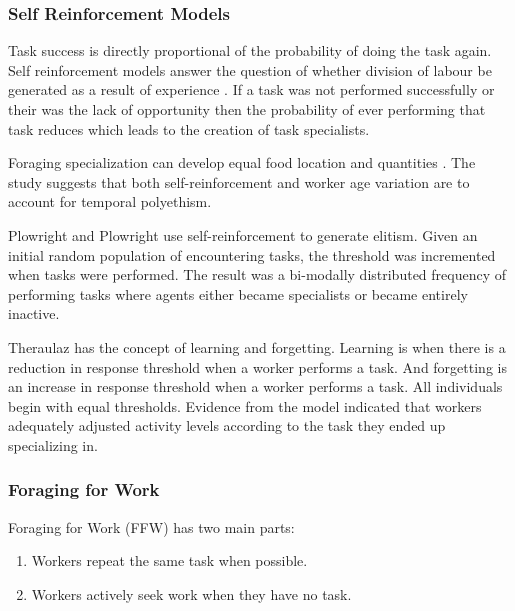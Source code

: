 \subsubsection{Self Reinforcement Models}
Task success is directly proportional of the probability of doing the task again. Self reinforcement models answer the question of whether division of labour be generated as a result of experience \cite{lerman2005review}. If a task was not performed successfully or their was the lack of opportunity then the probability of ever performing that task reduces which leads to the creation of task specialists. 

Foraging specialization can develop equal food location and quantities \cite{deneubourg1987self}.
The study suggests that both self-reinforcement and worker age variation are to account for temporal polyethism. 

Plowright and Plowright \cite{plowright1988elitism} use self-reinforcement to generate elitism. Given an initial random population of encountering tasks, the threshold was incremented when tasks were performed. The result was a bi-modally distributed frequency of performing tasks where agents either became specialists or became entirely inactive.

Theraulaz \cite{theraulaz1998response} has the concept of learning and forgetting. Learning is when there is a reduction in response threshold when a worker performs a task. And forgetting is an increase in response threshold when a worker performs a task. All individuals begin with equal thresholds. Evidence from the model indicated that workers adequately adjusted activity levels according to the task they ended up specializing in. %

\subsubsection{Foraging for Work}
Foraging for Work (FFW) has two main parts:
\begin{enumerate}
	\item Workers repeat the same task when possible.
	\item Workers actively seek work when they have no task.
\end{enumerate}


